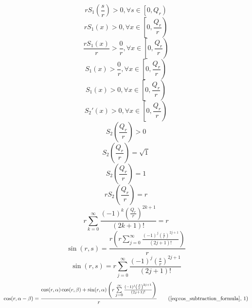\documentclass[a4paper,12pt]{report}
\begin{document}
\begin{equation}
r S_1{\left(\frac{s}{r}\right)} > 0, \forall s \in \left[0, Q_r\right)
\end{equation}
\begin{equation}
r S_1(x) > 0, \forall x \in \left[0, \frac{Q_r}{r}\right)
\end{equation}
\begin{equation}
\frac{r S_1(x)}{r} > \frac{0}{r}, \forall x \in \left[0, \frac{Q_r}{r}\right)
\end{equation}
\begin{equation}
S_1(x) > \frac{0}{r}, \forall x \in \left[0, \frac{Q_r}{r}\right)
\end{equation}
\begin{equation}
S_1(x) > 0, \forall x \in \left[0, \frac{Q_r}{r}\right)
\end{equation}
\begin{equation}
S_2'(x) > 0, \forall x \in \left[0, \frac{Q_r}{r}\right)
\end{equation}
\begin{equation}
S_2{\left(\frac{Q_r}{r}\right)} > 0
\end{equation}
\begin{equation}
S_2{\left(\frac{Q_r}{r}\right)} = \sqrt{1}
\end{equation}
\begin{equation}
S_2{\left(\frac{Q_r}{r}\right)} = 1
\end{equation}
\begin{equation}
r S_2{\left(\frac{Q_r}{r}\right)} = r
\end{equation}
\begin{equation}
r \sum \limits_{k=0}^{\infty} \frac{(-1)^k \left(\frac{Q_r}{r}\right)^{2k+1}}{(2k+1)!} = r
\end{equation}
\begin{equation}
\sin(r,s) = \frac{r \left(r \sum \limits_{j=0}^{\infty} \frac{(-1)^j \left(\frac{s}{r}\right)^{2j+1}}{(2j+1)!}\right)}{r}
\end{equation}
\begin{equation}
\sin(r,s) = r \sum \limits_{j=0}^{\infty} \frac{(-1)^j \left(\frac{s}{r}\right)^{2j+1}}{(2j+1)!}
\end{equation}
\begin{equation}
\cos(r,\alpha - \beta) = \frac{\cos(r,\alpha) \cos(r,\beta) + \sin(r,\alpha) \left(r \sum \limits_{j=0}^{\infty} \frac{(-1)^j \left(\frac{\beta}{r}\right)^{2j+1}}{(2j+1)!}\right)}{r}
\refstepcounter{equation}
\tag{\ref{eq:cos_subtraction_formula}, \theequation}
\end{equation}
\end{document}

